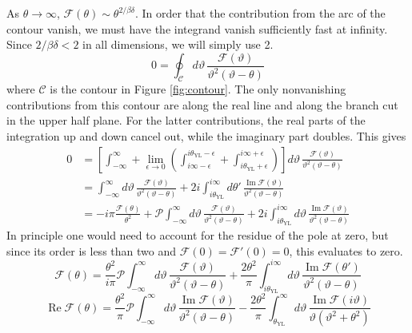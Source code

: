 \documentclass[
  aps,
  pre,
  preprint,
  longbibliography,
  floatfix
]{revtex4-2}
\begin{document}
As $\theta\to\infty$, $\mathcal F(\theta)\sim\theta^{2/\beta\delta}$. In order that the contribution from the arc of the contour vanish, we must have the integrand vanish sufficiently fast at infinity. Since $2/\beta\delta<2$ in all dimensions, we will simply use 2.
\begin{equation}
  0=\oint_{\mathcal C}d\vartheta\,\frac{\mathcal F(\vartheta)}{\vartheta^2(\vartheta-\theta)}
\end{equation}
where $\mathcal C$ is the contour in Figure \ref{fig:contour}. The only
nonvanishing contributions from this contour are along the real line and along
the branch cut in the upper half plane. For the latter contributions, the real
parts of the integration up and down cancel out, while the imaginary part
doubles. This gives
\begin{equation}
  \begin{aligned}
    0&=\left[\int_{-\infty}^\infty+\lim_{\epsilon\to0}\left(\int_{i\infty-\epsilon}^{i\theta_{\mathrm{YL}}-\epsilon}+\int^{i\infty+\epsilon}_{i\theta_{\mathrm{YL}}+\epsilon}\right)\right]
      d\vartheta\,\frac{\mathcal F(\vartheta)}{\vartheta^2(\vartheta-\theta)} \\
     &=\int_{-\infty}^\infty d\vartheta\,\frac{\mathcal F(\vartheta)}{\vartheta^2(\vartheta-\theta)}
     +2i\int_{i\theta_{\mathrm{YL}}}^{i\infty}d\theta'\,\frac{\operatorname{Im}\mathcal F(\vartheta)}{\vartheta^2(\vartheta-\theta)} \\
     &=-i\pi\frac{\mathcal F(\theta)}{\theta^2}+\mathcal P\int_{-\infty}^\infty d\vartheta\,\frac{\mathcal F(\vartheta)}{\vartheta^2(\vartheta-\theta)}
     +2i\int_{i\theta_{\mathrm{YL}}}^{i\infty}d\vartheta\,\frac{\operatorname{Im}\mathcal F(\vartheta)}{\vartheta^2(\vartheta-\theta)}
  \end{aligned}
\end{equation}
In principle one would need to account for the residue of the pole at zero, but since its order is less than two and $\mathcal F(0)=\mathcal F'(0)=0$, this evaluates to zero.
\begin{equation}
  \mathcal F(\theta)
  =\frac{\theta^2}{i\pi}\mathcal P\int_{-\infty}^\infty d\vartheta\,\frac{\mathcal F(\vartheta)}{\vartheta^2(\vartheta-\theta)}
  +\frac{2\theta^2}\pi\int_{i\theta_{\mathrm{YL}}}^{i\infty}d\vartheta\,\frac{\operatorname{Im}\mathcal F(\theta')}{\vartheta^2(\vartheta-\theta)}
\end{equation}
\begin{equation}
  \operatorname{Re}\mathcal F(\theta)
  =\frac{\theta^2}{\pi}\mathcal P\int_{-\infty}^\infty d\vartheta\,\frac{\operatorname{Im}\mathcal F(\vartheta)}{\vartheta^2(\vartheta-\theta)}
  -\frac{2\theta^2}\pi\int_{\theta_{\mathrm{YL}}}^{\infty}d\vartheta\,\frac{\operatorname{Im}\mathcal F(i\vartheta)}{\vartheta(\vartheta^2+\theta^2)}
\end{equation}
\end{document}
